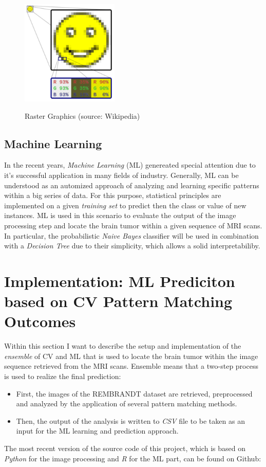 \documentclass[twoside,11pt]{article}
\begin{document}
\begin{figure}
	\centering
	\includegraphics[height=5cm]{pixel}
	\label{fig:pixel}
	\caption{Raster Graphics (source: Wikipedia)}
\end{figure}%

\subsection{Machine Learning}
In the recent years, \textit{Machine Learning} (ML) genereated special attention due to it's successful application in many fields of industry. Generally, ML can be understood as an automized approach of analyzing and learning specific patterns within a big series of data. For this purpose, statistical principles are implemented on a given \textit{training set} to predict then the class or value of new instances. ML is used in this scenario to evaluate the output of the image processing step and locate the brain tumor within a given sequence of MRI scans. In particular, the probabilistic \textit{Naive Bayes} classifier will be used in combination with a \textit{Decision Tree} due to their simplicity, which allows a solid interpretabiliby.

\section{Implementation: ML Prediciton based on CV Pattern Matching Outcomes}
Within this section I want to describe the setup and implementation of the \textit{ensemble} of CV and ML that is used to locate the brain tumor within the image sequence retrieved from the MRI scans. Ensemble means that a two-step process is used to realize the final prediction:
\begin{itemize}
	\item First, the images of the REMBRANDT dataset are retrieved, preprocessed and analyzed by the application of several pattern matching methods.
	\item Then, the output of the analysis is written to \textit{CSV} file to be taken as an input for the ML learning and prediction approach.
\end{itemize}
The most recent version of the source code of this project, which is based on  \textit{Python} for the image processing and \textit{R} for the ML part, can be found on Github: 
\end{document}
